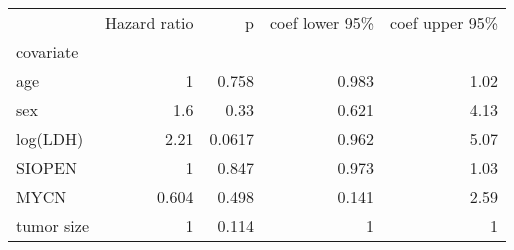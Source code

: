 \begin{tabular}{lrrrr}
\toprule
{} &  Hazard ratio &      p &  coef lower 95\% &  coef upper 95\% \\
covariate  &               &        &                  &                  \\
\midrule
age        &             1 &  0.758 &            0.983 &             1.02 \\
sex        &           1.6 &   0.33 &            0.621 &             4.13 \\
log(LDH)   &          2.21 & 0.0617 &            0.962 &             5.07 \\
SIOPEN     &             1 &  0.847 &            0.973 &             1.03 \\
MYCN       &         0.604 &  0.498 &            0.141 &             2.59 \\
tumor size &             1 &  0.114 &                1 &                1 \\
\bottomrule
\end{tabular}
